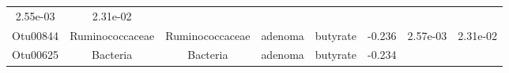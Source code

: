 \documentclass[11pt,]{article}
\begin{document}
\begin{longtable}[]{@{}cccccccc@{}}
\begin{minipage}[t]{0.08\columnwidth}
2.55e-03\strut
\end{minipage} & \begin{minipage}[t]{0.08\columnwidth}\centering\strut
2.31e-02\strut
\end{minipage}\tabularnewline
\begin{minipage}[t]{0.08\columnwidth}\centering\strut
Otu00844\strut
\end{minipage} & \begin{minipage}[t]{0.15\columnwidth}\centering\strut
Ruminococcaceae\strut
\end{minipage} & \begin{minipage}[t]{0.15\columnwidth}\centering\strut
Ruminococcaceae\strut
\end{minipage} & \begin{minipage}[t]{0.08\columnwidth}\centering\strut
adenoma\strut
\end{minipage} & \begin{minipage}[t]{0.09\columnwidth}\centering\strut
butyrate\strut
\end{minipage} & \begin{minipage}[t]{0.07\columnwidth}\centering\strut
-0.236\strut
\end{minipage} & \begin{minipage}[t]{0.08\columnwidth}\centering\strut
2.57e-03\strut
\end{minipage} & \begin{minipage}[t]{0.08\columnwidth}\centering\strut
2.31e-02\strut
\end{minipage}\tabularnewline
\begin{minipage}[t]{0.08\columnwidth}\centering\strut
Otu00625\strut
\end{minipage} & \begin{minipage}[t]{0.15\columnwidth}\centering\strut
Bacteria\strut
\end{minipage} & \begin{minipage}[t]{0.15\columnwidth}\centering\strut
Bacteria\strut
\end{minipage} & \begin{minipage}[t]{0.08\columnwidth}\centering\strut
adenoma\strut
\end{minipage} & \begin{minipage}[t]{0.09\columnwidth}\centering\strut
butyrate\strut
\end{minipage} & \begin{minipage}[t]{0.07\columnwidth}\centering\strut
-0.234\strut
\end{minipage} & \begin{minipage}[t]{0.08\columnwidth}\centering\strut

\end{minipage}
\end{longtable}
\end{document}
